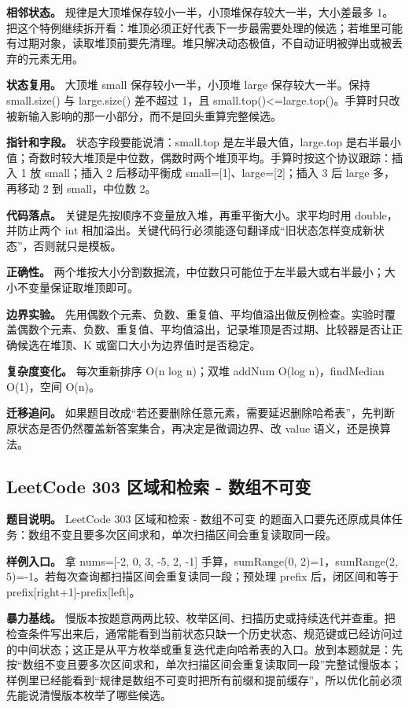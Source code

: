 \textbf{相邻状态。} 规律是大顶堆保存较小一半，小顶堆保存较大一半，大小差最多 1。把这个特例继续拆开看：堆顶必须正好代表下一步最需要处理的候选；若堆里可能有过期对象，读取堆顶前要先清理。堆只解决动态极值，不自动证明被弹出或被丢弃的元素无用。

\textbf{状态复用。} 大顶堆 small 保存较小一半，小顶堆 large 保存较大一半。保持 small.size() 与 large.size() 差不超过 1，且 small.top()<=large.top()。手算时只改被新输入影响的那一小部分，而不是回头重算完整候选。

\textbf{指针和字段。} 状态字段要能说清：small.top 是左半最大值，large.top 是右半最小值；奇数时较大堆顶是中位数，偶数时两个堆顶平均。手算时按这个协议跟踪：插入 1 放 small；插入 2 后移动平衡成 small=[1]、large=[2]；插入 3 后 large 多，再移动 2 到 small，中位数 2。

\textbf{代码落点。} 关键是先按顺序不变量放入堆，再重平衡大小。求平均时用 double，并防止两个 int 相加溢出。关键代码行必须能逐句翻译成“旧状态怎样变成新状态”，否则就只是模板。

\textbf{正确性。} 两个堆按大小分割数据流，中位数只可能位于左半最大或右半最小；大小不变量保证取堆顶即可。

\textbf{边界实验。} 先用偶数个元素、负数、重复值、平均值溢出做反例检查。实验时覆盖偶数个元素、负数、重复值、平均值溢出，记录堆顶是否过期、比较器是否让正确候选在堆顶、K 或窗口大小为边界值时是否稳定。

\textbf{复杂度变化。} 每次重新排序 O(n log n)；双堆 addNum O(log n)，findMedian O(1)，空间 O(n)。

\textbf{迁移追问。} 如果题目改成“若还要删除任意元素，需要延迟删除哈希表”，先判断原状态是否仍然覆盖新答案集合，再决定是微调边界、改 value 语义，还是换算法。

\subsection{LeetCode 303 区域和检索 - 数组不可变}

\textbf{题目说明。} LeetCode 303 区域和检索 - 数组不可变 的题面入口要先还原成具体任务：数组不变且要多次区间求和，单次扫描区间会重复读取同一段。

\textbf{样例入口。} 拿 nums=[-2, 0, 3, -5, 2, -1] 手算，sumRange(0, 2)=1，sumRange(2, 5)=-1。若每次查询都扫描区间会重复读同一段；预处理 prefix 后，闭区间和等于 prefix[right+1]-prefix[left]。

\textbf{暴力基线。} 慢版本按题意两两比较、枚举区间、扫描历史或持续迭代并查重。把检查条件写出来后，通常能看到当前状态只缺一个历史状态、规范键或已经访问过的中间状态；这正是从平方枚举或重复迭代走向哈希表的入口。放到本题就是：先按“数组不变且要多次区间求和，单次扫描区间会重复读取同一段”完整试慢版本；样例里已经能看到“规律是数组不可变时把所有前缀和提前缓存”，所以优化前必须先能说清慢版本枚举了哪些候选。

